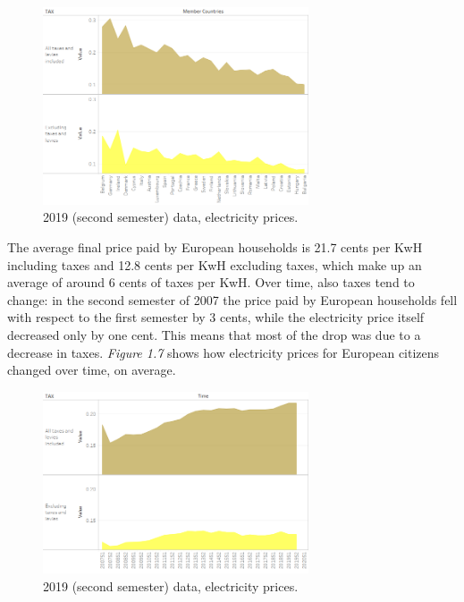\documentclass{book}
\begin{document}
\bigskip
\begin{figure}[H]
\begin{center}
\captionsetup{justification=centering}
\includegraphics[width=0.7\textwidth]{Images/Taxes.png}
\caption{2019 (second semester) data, electricity prices. }
\end{center}
\end{figure}
\bigskip

The average final price paid by European households is 21.7 cents per KwH including taxes and 12.8 cents per KwH excluding taxes, which make up an average of around 6 cents of taxes per KwH. Over time, also taxes tend to change: in the second semester of 2007 the price paid by European households fell with respect to the first semester by 3 cents, while the electricity price itself decreased only by one cent. This means that most of the drop was due to a decrease in taxes. \textit{Figure 1.7} shows how electricity prices for European citizens changed over time, on average.

\bigskip
\begin{figure}[H]
\begin{center}
\captionsetup{justification=centering}
\includegraphics[width=0.7\textwidth]{Images/TaxesTime.png}
\caption{2019 (second semester) data, electricity prices. }
\end{center}
\end{figure}
\bigskip
\end{document}
